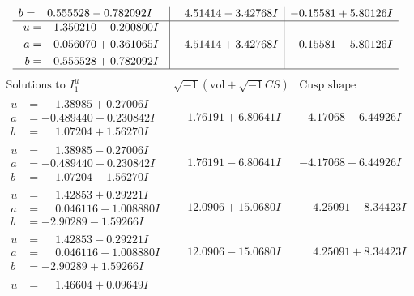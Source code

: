 \documentclass[1p]{elsarticle_modified}
\theoremstyle{definition}
\newcommand{\I}{\sqrt{-1}}
\begin{document}
$$\begin{array}{c|c|c}
\begin{aligned}
b &= \phantom{-}0.555528 - 0.782092 I\end{aligned}
 & \phantom{-}4.51414 - 3.42768 I & -0.15581 + 5.80126 I \\ \hline\begin{aligned}
u &= -1.350210 - 0.200800 I \\
a &= -0.056070 + 0.361065 I \\
b &= \phantom{-}0.555528 + 0.782092 I\end{aligned}
 & \phantom{-}4.51414 + 3.42768 I & -0.15581 - 5.80126 I\\
 \hline 
 \end{array}$$\newpage$$\begin{array}{c|c|c}  
\text{Solutions to }I^u_{1}& \I (\text{vol} + \sqrt{-1}CS) & \text{Cusp shape}\\
 \hline 
\begin{aligned}
u &= \phantom{-}1.38985 + 0.27006 I \\
a &= -0.489440 + 0.230842 I \\
b &= \phantom{-}1.07204 + 1.56270 I\end{aligned}
 & \phantom{-}1.76191 + 6.80641 I & -4.17068 - 6.44926 I \\ \hline\begin{aligned}
u &= \phantom{-}1.38985 - 0.27006 I \\
a &= -0.489440 - 0.230842 I \\
b &= \phantom{-}1.07204 - 1.56270 I\end{aligned}
 & \phantom{-}1.76191 - 6.80641 I & -4.17068 + 6.44926 I \\ \hline\begin{aligned}
u &= \phantom{-}1.42853 + 0.29221 I \\
a &= \phantom{-}0.046116 - 1.008880 I \\
b &= -2.90289 - 1.59266 I\end{aligned}
 & \phantom{-}12.0906 + 15.0680 I & \phantom{-}4.25091 - 8.34423 I \\ \hline\begin{aligned}
u &= \phantom{-}1.42853 - 0.29221 I \\
a &= \phantom{-}0.046116 + 1.008880 I \\
b &= -2.90289 + 1.59266 I\end{aligned}
 & \phantom{-}12.0906 - 15.0680 I & \phantom{-}4.25091 + 8.34423 I \\ \hline\begin{aligned}
u &= \phantom{-}1.46604 + 0.09649 I \\

\end{aligned}
\end{array}$$
\end{document}
